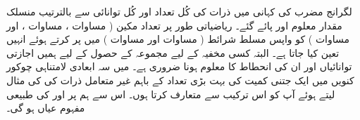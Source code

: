 لگرانج مضرب کی کہانی میں ذرات کی کُل تعداد اور کُل توانائی سے بالترتیب منسلک مقدار معلوم  اور  پائے گئے۔ ریاضیاتی طور پر تعداد مکین ( مساوات ، مساوات ، اور مساوات ) کو واپس مسلط شرائط ( مساوات  اور مساوات  ) میں پر کرتے ہوئے انہیں تعین کیا جاتا ہے۔ البتہ کسی مخفیہ کے لیے مجموعہ کے حصول کے لیے ہمیں اجازتی توانائیاں  اور ان کی انحطاط  کا معلوم ہونا ضروری ہے۔ میں سہ ابعادی لامتناہی چوکور کنویں میں ایک جتنی کمیت کی بہت بڑی تعداد کے باہم غیر متعامل ذرات کی  کی مثال لیتے ہوئے آپ کو اس ترکیب سے متعارف کرتا ہوں۔ اس سے ہم پر  اور  کی طبیعی مفہوم عیاں ہو گی۔ 

